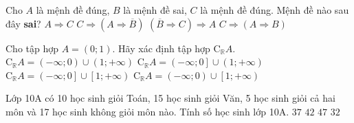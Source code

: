 \begin{ex}%
	Cho $A$ là mệnh đề đúng, $B$ là mệnh đề sai, $C$ là mệnh đề đúng. Mệnh đề nào sau đây {\bf sai}?
	\choice
	{$A\Rightarrow C$}
	{$C\Rightarrow \left(A\Rightarrow\overline{B}\right)$}
	{$\left(\overline{B}\Rightarrow C\right)\Rightarrow A$}
	{\True $C\Rightarrow (A\Rightarrow B)$}
\end{ex}
\begin{ex}%
	Cho tập hợp $A=\left(0;1\right)$. Hãy xác định tập hợp $\mathrm{C}_{\mathbb{R}}A.$
	\choice
	{$\mathrm{C}_{\mathbb{R}}A=\left(-\infty;0\right)\cup\left(1;+\infty\right)$}
	{$\mathrm{C}_{\mathbb{R}}A=\left(-\infty;0\right]\cup\left(1;+\infty\right)$}
	{\True $\mathrm{C}_{\mathbb{R}}A=\left(-\infty;0\right]\cup\left[1;+\infty\right)$}
	{$\mathrm{C}_{\mathbb{R}}A=\left(-\infty;0\right)\cup\left[1;+\infty\right)$}
	\loigiai{
		$\mathrm{C}_{\mathbb{R}}A=\{x\mid x\in\mathbb{R}\text{ và } x\notin A\}=\left(-\infty;0\right]\cup\left[1;+\infty\right)$.
	}
\end{ex}
\begin{ex}%
	Lớp 10A có 10 học sinh giỏi Toán, 15 học sinh giỏi Văn, 5 học sinh giỏi cả hai môn và 17 học sinh không giỏi môn nào. Tính số học sinh lớp 10A.
	\choice
	{\True $37$}
	{$42$}
	{$47$}
	{$32$}
\end{ex}


